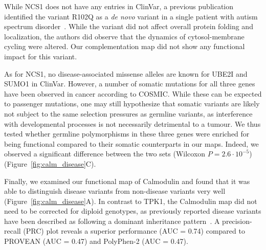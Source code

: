 While NCS1 does not have any entries in ClinVar, a previous publication identified the variant R102Q as a \textit{de novo} variant in a single patient with autism spectrum disorder~\cite{handley_structural_2010}. While the variant did not affect overall protein folding and localization, the authors did observe that the dynamics of cytosol-membrane cycling were altered. Our complementation map did not show any functional impact for this variant.

As for NCS1, no disease-associated missense alleles are known for UBE2I and SUMO1 in ClinVar. However, a number of somatic mutations for all three genes have been observed in cancer according to COSMIC. While these can be expected to passenger mutations, one may still hypothesize that somatic variants are likely not subject to the same selection pressures as germline variants, as interference with developmental processes is not necessarily detrimental to a tumour. We thus tested whether germline polymorphisms in these three genes were enriched for being functional compared to their somatic counterparts in our maps. Indeed, we observed a significant difference between the two sets (Wilcoxon $P = 2.6 \cdot 10^{-5}$) (Figure~\ref{fig:calm_disease}C).

Finally, we examined our functional map of Calmodulin and found that it was able to distinguish disease variants from non-disease variants very well (Figure~\ref{fig:calm_disease}A). In contrast to TPK1, the Calmodulin map did not need to be corrected for diploid genotypes, as previously reported disease variants have been described as following a dominant inheritance pattern~\cite{crotti_calmodulin_2013}. A precision-recall (PRC) plot reveals a superior performance (AUC = 0.74) compared to PROVEAN (AUC = 0.47) and PolyPhen-2 (AUC = 0.47).  


